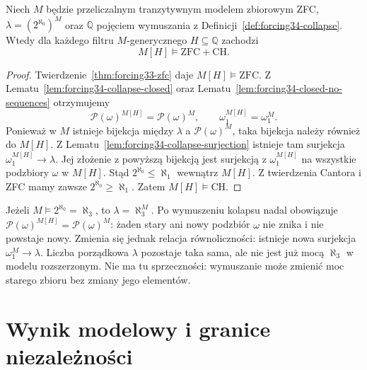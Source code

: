 \begin{twierdzenie}
\label{thm:forcing34-ch}
Niech $M$ będzie przeliczalnym
tranzytywnym modelem zbiorowym ZFC,
$\lambda=(2^{\aleph_0})^M$
oraz $\mathbb Q$ pojęciem wymuszania
z Definicji~\ref{def:forcing34-collapse}.
Wtedy dla każdego filtru
$M$-generycznego $H\subseteq\mathbb Q$
zachodzi
\[
 M[H]\models\mathrm{ZFC}+\mathrm{CH}.
\]
\end{twierdzenie}
\begin{proof}
Twierdzenie~\ref{thm:forcing33-zfc}
daje $M[H]\models\mathrm{ZFC}$.
Z Lematu~\ref{lem:forcing34-collapse-closed}
oraz Lematu~\ref{lem:forcing34-closed-no-sequences}
otrzymujemy
\[
 \mathcal P(\omega)^{M[H]}
 =\mathcal P(\omega)^M,
 \qquad
 \omega_1^{M[H]}=\omega_1^M.
\]
Ponieważ w $M$ istnieje bijekcja
między $\lambda$ a $\mathcal P(\omega)^M$,
taka bijekcja należy również
do $M[H]$.
Z Lematu~\ref{lem:forcing34-collapse-surjection}
istnieje tam surjekcja
$\omega_1^{M[H]}\to\lambda$.
Jej złożenie z powyższą bijekcją
jest surjekcją z $\omega_1^{M[H]}$
na wszystkie podzbiory $\omega$
w $M[H]$. Stąd
$2^{\aleph_0}\leq\aleph_1$
wewnątrz $M[H]$.
Z twierdzenia Cantora i ZFC
mamy zawsze
$2^{\aleph_0}\geq\aleph_1$.
Zatem $M[H]\models\mathrm{CH}$.
\end{proof}

\begin{przyklad}
\label{ex:forcing34-collapse-change}
Jeżeli $M\models
2^{\aleph_0}=\aleph_3$, to
$\lambda=\aleph_3^M$.
Po wymuszeniu kolapsu nadal
obowiązuje
$\mathcal P(\omega)^{M[H]}
=\mathcal P(\omega)^M$:
żaden stary ani nowy podzbiór
$\omega$ nie znika i nie
powstaje nowy. Zmienia się
jednak relacja równoliczności:
istnieje nowa surjekcja
$\omega_1^M\to\lambda$.
Liczba porządkowa $\lambda$
pozostaje taka sama, ale nie
jest już mocą $\aleph_3$
w modelu rozszerzonym.
Nie ma tu sprzeczności:
wymuszanie może zmienić
moc starego zbioru bez
zmiany jego elementów.
\end{przyklad}

\section{Wynik modelowy i granice niezależności}

